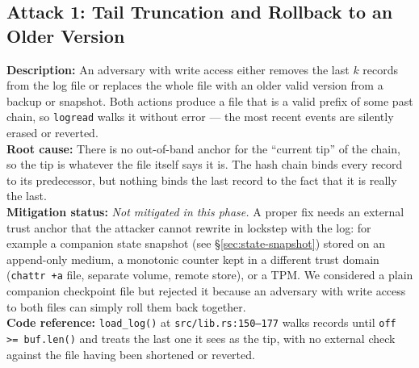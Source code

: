 \documentclass[a4paper, 12pt]{article}
\begin{document}
    \subsection{Attack 1: Tail Truncation and Rollback to an Older Version} \label{attack_1}
    \textbf{Description:} An adversary with write access either removes the last $k$ records from the log file or replaces the whole file with an older valid version from a backup or snapshot. Both actions produce a file that is a valid prefix of some past chain, so \texttt{logread} walks it without error --- the most recent events are silently erased or reverted. \\
    \textbf{Root cause:} There is no out-of-band anchor for the ``current tip'' of the chain, so the tip is whatever the file itself says it is. The hash chain binds every record to its predecessor, but nothing binds the last record to the fact that it is really the last. \\
    \textbf{Mitigation status:} \emph{Not mitigated in this phase.} A proper fix needs an external trust anchor that the attacker cannot rewrite in lockstep with the log: for example a companion state snapshot (see \S\ref{sec:state-snapshot}) stored on an append-only medium, a monotonic counter kept in a different trust domain (\texttt{chattr +a} file, separate volume, remote store), or a TPM. We considered a plain companion checkpoint file but rejected it because an adversary with write access to both files can simply roll them back together. \\
    \textbf{Code reference:} \texttt{load\_log()} at \texttt{src/lib.rs:150--177} walks records until \texttt{off >= buf.len()} and treats the last one it sees as the tip, with no external check against the file having been shortened or reverted.
\end{document}
